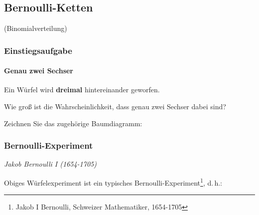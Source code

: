 \subsection{Bernoulli-Ketten}
(Binomialverteilung)


\subsubsection{Einstiegsaufgabe}

\paragraph{Genau zwei Sechser} Ein Würfel wird \textbf{dreimal} hintereinander geworfen.

Wie groß ist die Wahrscheinlichkeit, dass genau zwei Sechser dabei sind?


Zeichnen Sie das zugehörige Baumdiagramm:

\newpage


\subsubsection{Bernoulli-Experiment}

\begin{center}\textit{Jakob Bernoulli I (1654-1705)}\end{center}

Obiges Würfelexperiment ist ein typisches
Bernoulli-Experiment\footnote{Jakob I Bernoulli, Schweizer Mathematiker,
  1654-1705}, d.\,h.:

